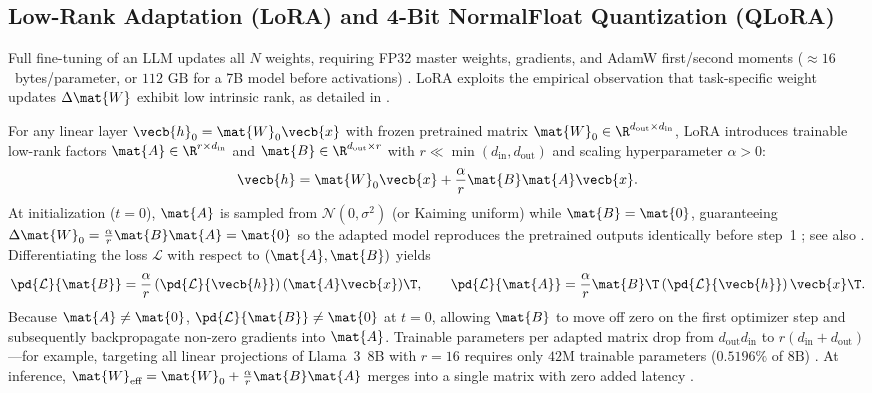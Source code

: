 \documentclass[../../../../master.tex]{subfiles}
\begin{document}
\subsection{Low-Rank Adaptation (LoRA) and 4-Bit NormalFloat Quantization (QLoRA)}
\label{sec:pretrain:lora_qlora}

Full fine-tuning of an LLM updates all $N$ weights, requiring FP32 master weights, gradients, and AdamW first/second moments ($\approx 16$~bytes/parameter, or $112\text{ GB}$ for a 7B model before activations) . LoRA exploits the empirical observation that task-specific weight updates $\Delta \mat{W}$ exhibit low intrinsic rank, as detailed in .

\begin{coremath}
For any linear layer $\vecb{h}_0 = \mat{W}_0 \vecb{x}$ with frozen pretrained matrix $\mat{W}_0 \in \R^{d_{\text{out}} \times d_{\text{in}}}$, LoRA introduces trainable low-rank factors $\mat{A} \in \R^{r \times d_{\text{in}}}$ and $\mat{B} \in \R^{d_{\text{out}} \times r}$ with $r \ll \min(d_{\text{in}}, d_{\text{out}})$ and scaling hyperparameter $\alpha > 0$:
\begin{equation}
  \vecb{h} = \mat{W}_0 \vecb{x} + \frac{\alpha}{r}\mat{B}\mat{A}\vecb{x}.
  \label{eq:pretrain:lora_forward}
\end{equation}
At initialization ($t=0$), $\mat{A}$ is sampled from $\mathcal{N}(0, \sigma^2)$ (or Kaiming uniform) while $\mat{B} = \mat{0}$, guaranteeing $\Delta \mat{W}_0 = \frac{\alpha}{r}\mat{B}\mat{A} = \mat{0}$ so the adapted model reproduces the pretrained outputs identically before step~1 ; see also . Differentiating the loss $\mathcal{L}$ with respect to $(\mat{A}, \mat{B})$ yields
\begin{equation}
  \pd{\mathcal{L}}{\mat{B}} = \frac{\alpha}{r} \left(\pd{\mathcal{L}}{\vecb{h}}\right) (\mat{A}\vecb{x})\T, \qquad
  \pd{\mathcal{L}}{\mat{A}} = \frac{\alpha}{r} \mat{B}\T \left(\pd{\mathcal{L}}{\vecb{h}}\right) \vecb{x}\T.
  \label{eq:pretrain:lora_grads}
\end{equation}
Because $\mat{A} \neq \mat{0}$, $\pd{\mathcal{L}}{\mat{B}} \neq \mat{0}$ at $t=0$, allowing $\mat{B}$ to move off zero on the first optimizer step and subsequently backpropagate non-zero gradients into $\mat{A}$. Trainable parameters per adapted matrix drop from $d_{\text{out}} d_{\text{in}}$ to $r(d_{\text{in}} + d_{\text{out}})$---for example, targeting all linear projections of Llama~3~8B with $r=16$ requires only $42\text{M}$ trainable parameters ($0.5196\%$ of $8\text{B}$) . At inference, $\mat{W}_{\text{eff}} = \mat{W}_0 + \frac{\alpha}{r}\mat{B}\mat{A}$ merges into a single matrix with zero added latency .
\end{coremath}
\end{document}
